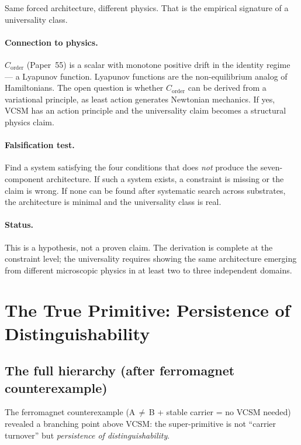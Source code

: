 \documentclass[11pt]{article}
\begin{document}
Same forced architecture, different physics. That is the empirical signature of a
universality class.

\paragraph{Connection to physics.}
$C_\text{order}$ (Paper~55) is a scalar with monotone positive drift in the identity
regime --- a Lyapunov function. Lyapunov functions are the non-equilibrium analog of
Hamiltonians. The open question is whether $C_\text{order}$ can be derived from a
variational principle, as least action generates Newtonian mechanics. If yes, VCSM has
an action principle and the universality claim becomes a structural physics claim.

\paragraph{Falsification test.}
Find a system satisfying the four conditions that does \emph{not} produce the
seven-component architecture. If such a system exists, a constraint is missing or the
claim is wrong. If none can be found after systematic search across substrates, the
architecture is minimal and the universality class is real.

\paragraph{Status.}
This is a hypothesis, not a proven claim. The derivation is complete at the constraint
level; the universality requires showing the same architecture emerging from different
microscopic physics in at least two to three independent domains.

\section{The True Primitive: Persistence of Distinguishability}
\label{sec:true_primitive}

\subsection{The full hierarchy (after ferromagnet counterexample)}

The ferromagnet counterexample (A\,$\neq$\,B + stable carrier = no VCSM needed)
revealed a branching point above VCSM: the super-primitive is not
``carrier turnover'' but \emph{persistence of distinguishability}.
\end{document}
